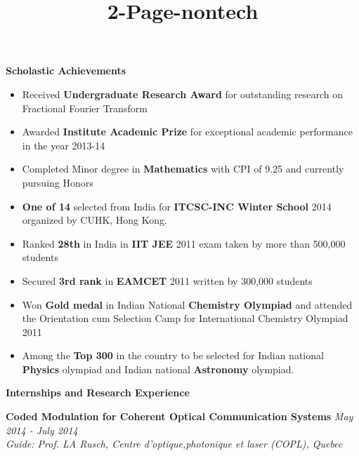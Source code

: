 \documentclass[a4paper,10pt]{article}
\title{2-Page-nontech}
\newcommand{\resheading}[1]{
	{\large \colorbox{mygrey}{\begin{minipage}{\textwidth}{\textbf{#1 \vphantom{p\^{E}}}}\end{minipage}}}
}
\newcommand{\ressubheadingWithGuide}[3]{%

	\textbf{#1} \hfill \textit{#2}\null\\
	\textit{\small #3} %
	\vspace{-4pt}
}
\begin{document}
\newcommand{\mywebheader}{
\begin{tabular*}{7in}{l@{\extracolsep{\fill}}r}
	\textbf{\href{http://www.home.iitb.ac.in/~sasank}{\LARGE Sasank Chilamkurthy}} & \href{mailto:sasank@iitb.ac.in}{sasank@iitb.ac.in}\\
	 & \href{http://home.iitb.ac.in/~sasank}{http://home.iitb.ac.in/\textasciitilde sasank} \\
	\end{tabular*}
\\
\vspace{0.1in}}

\vspace*{1.6in}

\resheading{Scholastic Achievements} 
	\begin{itemize}\itemsep -1pt
    	\item Received \textbf{Undergraduate Research Award} for outstanding research on Fractional Fourier Transform %
		\item Awarded \textbf{Institute Academic Prize} for exceptional academic performance in the year 2013-14
        \item Completed Minor degree in \textbf{Mathematics} with CPI of 9.25 and currently pursuing Honors
		\item \textbf{One of 14} selected from India for \textbf{ITCSC-INC Winter School} 2014 organized by CUHK, Hong Kong.
		\item Ranked \textbf{28th} in India in \textbf{IIT JEE} 2011 exam taken by more than 500,000 students
		\item Secured \textbf{3rd rank} in \textbf{EAMCET} 2011 written by 300,000 students
		\item Won \textbf{Gold medal} in Indian National \textbf{Chemistry Olympiad} and attended the Orientation cum Selection Camp for International Chemistry Olympiad 2011
		\item Among the \textbf{Top 300} in the country to be selected for Indian national \textbf{Physics} olympiad and Indian national \textbf{Astronomy} olympiad. 
    \end{itemize}
\resheading{Internships and Research Experience}
        	\ressubheadingWithGuide{Coded Modulation for Coherent Optical Communication Systems}{\textit{May 2014 - July 2014}}{Guide: Prof. LA Rusch, Centre d'optique,photonique et laser (COPL), Quebec}
\end{document}

